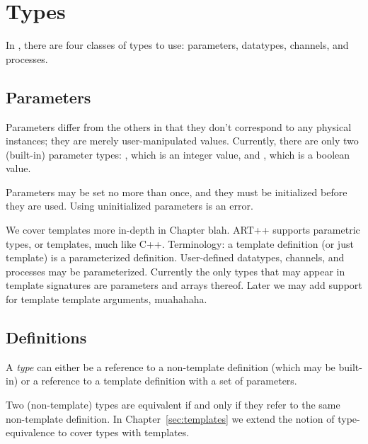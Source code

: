 

\chapter{Types}
\label{sec:types}

In \artxx, there are four classes of types to use:
parameters, datatypes, channels, and processes.  

\section{Parameters}
\label{sec:parameters}

Parameters differ from the others in that they don't correspond
to any physical instances; they are merely user-manipulated values.  
Currently, there are only two (built-in) parameter types: 
\pint, which is an integer value,
and \pbool, which is a boolean value.  

Parameters may be set no more than once, and they must be 
initialized before they are used.  
Using uninitialized parameters is an error.  


We cover templates more in-depth in Chapter blah.  
ART++ supports parametric types, or templates, much like C++. 
Terminology: a template definition (or just template)
is a parameterized definition.  
User-defined datatypes, channels, and processes may be parameterized.  
Currently the only types that may appear in template signatures
are parameters and arrays thereof.  
Later we may add support for template template arguments, muahahaha.  

\section{Definitions}
\label{sec:types:definition}

A \emph{type} can either be a reference to a non-template definition
(which may be built-in) or a reference to a template definition
with a set of parameters.  

Two (non-template) types are equivalent if and only if 
they refer to the same non-template definition.  
In Chapter~\ref{sec:templates} we extend the notion of type-equivalence
to cover types with templates.  

